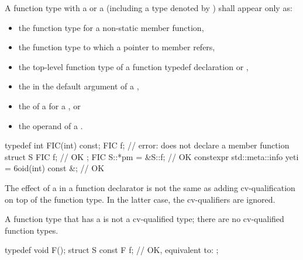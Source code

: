 \pnum
A function type with a  or a
 (including a type denoted by
)
shall appear only as:
\begin{itemize}
\item the function type for a non-static member function,

\item the function type to which a pointer to member refers,

\item the top-level function type of a function typedef declaration
or ,

\item the  in the default argument of a
,

\item the  of a  for a
, or

\item the operand of a .
\end{itemize}
\begin{example}
\begin{codeblock}
typedef int FIC(int) const;
FIC f;                                                  // error: does not declare a member function
struct S {
  FIC f;                                                // OK
};
FIC S::*pm = &S::f;                                     // OK
constexpr std::meta::info yeti = ^^void(int) const &;   // OK
\end{codeblock}
\end{example}

\pnum
The effect of a
in a function declarator is not the same as
adding cv-qualification on top of the function type.
In the latter case, the cv-qualifiers are ignored.
\begin{note}
A function type that has a  is not a
cv-qualified type; there are no cv-qualified function types.
\end{note}
\begin{example}
\begin{codeblock}
typedef void F();
struct S {
  const F f;        // OK, equivalent to: 
};
\end{codeblock}
\end{example}

